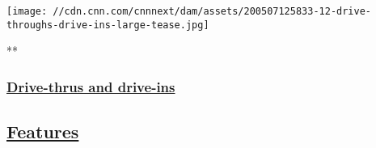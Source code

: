 \href{/2020/05/07/world/gallery/drive-thrus-drive-ins-coronavirus/index.html}{}

\texttt{[image: //cdn.cnn.com/cnnnext/dam/assets/200507125833-12-drive-throughs-drive-ins-large-tease.jpg]}

**

\hypertarget{drive-thrus-and-drive-ins}{%
\subsubsection{\texorpdfstring{\href{/2020/05/07/world/gallery/drive-thrus-drive-ins-coronavirus/index.html}{Drive-thrus
and
drive-ins}}{Drive-thrus and drive-ins}}\label{drive-thrus-and-drive-ins}}

\hypertarget{features-}{%
\subsection{\texorpdfstring{\href{/specials/cnn-photos-archive}{Features}~}{Features~}}\label{features-}}

